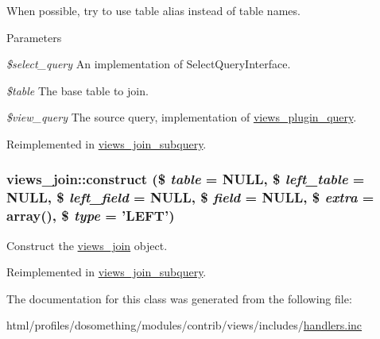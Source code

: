When possible, try to use table alias instead of table names.


\begin{DoxyParams}{Parameters}
\item[{\em \$select\_\-query}]An implementation of SelectQueryInterface. \item[{\em \$table}]The base table to join. \item[{\em \$view\_\-query}]The source query, implementation of \hyperlink{classviews__plugin__query}{views\_\-plugin\_\-query}. \end{DoxyParams}


Reimplemented in \hyperlink{classviews__join__subquery_aced6dd7573a138cd4f527b340fee501e}{views\_\-join\_\-subquery}.\hypertarget{classviews__join_ac6c6e70389e0c59e4b068903ef4950b9}{
\subsubsection[{construct}]{\setlength{\rightskip}{0pt plus 5cm}views\_\-join::construct (\$ {\em table} = {\ttfamily NULL}, \/  \$ {\em left\_\-table} = {\ttfamily NULL}, \/  \$ {\em left\_\-field} = {\ttfamily NULL}, \/  \$ {\em field} = {\ttfamily NULL}, \/  \$ {\em extra} = {\ttfamily array()}, \/  \$ {\em type} = {\ttfamily 'LEFT'})}}
\label{classviews__join_ac6c6e70389e0c59e4b068903ef4950b9}
Construct the \hyperlink{classviews__join}{views\_\-join} object. 

Reimplemented in \hyperlink{classviews__join__subquery_a27a49742ee109b1329adcb86512837ab}{views\_\-join\_\-subquery}.

The documentation for this class was generated from the following file:\begin{DoxyCompactItemize}
\item 
html/profiles/dosomething/modules/contrib/views/includes/\hyperlink{handlers_8inc}{handlers.inc}\end{DoxyCompactItemize}
